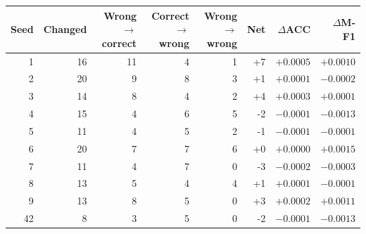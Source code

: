 \begin{tabular}{rrrrrrrr}
\toprule
Seed & Changed & Wrong$\rightarrow$correct & Correct$\rightarrow$wrong & Wrong$\rightarrow$wrong & Net & $\Delta$ACC & $\Delta$M-F1 \\
\midrule
1 & 16 & 11 & 4 & 1 & +7 & $+0.0005$ & $+0.0010$ \\
2 & 20 & 9 & 8 & 3 & +1 & $+0.0001$ & $-0.0002$ \\
3 & 14 & 8 & 4 & 2 & +4 & $+0.0003$ & $+0.0001$ \\
4 & 15 & 4 & 6 & 5 & -2 & $-0.0001$ & $-0.0013$ \\
5 & 11 & 4 & 5 & 2 & -1 & $-0.0001$ & $-0.0001$ \\
6 & 20 & 7 & 7 & 6 & +0 & $+0.0000$ & $+0.0015$ \\
7 & 11 & 4 & 7 & 0 & -3 & $-0.0002$ & $-0.0003$ \\
8 & 13 & 5 & 4 & 4 & +1 & $+0.0001$ & $-0.0001$ \\
9 & 13 & 8 & 5 & 0 & +3 & $+0.0002$ & $+0.0011$ \\
42 & 8 & 3 & 5 & 0 & -2 & $-0.0001$ & $-0.0013$ \\
\bottomrule
\end{tabular}
